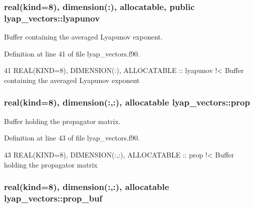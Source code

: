 \subsubsection[{\texorpdfstring{lyapunov}{lyapunov}}]{\setlength{\rightskip}{0pt plus 5cm}real(kind=8), dimension(\+:), allocatable, public lyap\+\_\+vectors\+::lyapunov}\hypertarget{namespacelyap__vectors_a9bf23b3cf7aebbfe17422bbd63e95bab}{}\label{namespacelyap__vectors_a9bf23b3cf7aebbfe17422bbd63e95bab}


Buffer containing the averaged Lyapunov exponent. 



Definition at line 41 of file lyap\+\_\+vectors.\+f90.


\begin{DoxyCode}
41   \textcolor{keywordtype}{REAL(KIND=8)}, \textcolor{keywordtype}{DIMENSION(:)}, \textcolor{keywordtype}{ALLOCATABLE} :: lyapunov\textcolor{comment}{   !< Buffer containing the averaged Lyapunov exponent}
\end{DoxyCode}
\subsubsection[{\texorpdfstring{prop}{prop}}]{\setlength{\rightskip}{0pt plus 5cm}real(kind=8), dimension(\+:,\+:), allocatable lyap\+\_\+vectors\+::prop\hspace{0.3cm}{\ttfamily [private]}}\hypertarget{namespacelyap__vectors_a64ed59283a3d1411d14735b924b5794b}{}\label{namespacelyap__vectors_a64ed59283a3d1411d14735b924b5794b}


Buffer holding the propagator matrix. 



Definition at line 43 of file lyap\+\_\+vectors.\+f90.


\begin{DoxyCode}
43   \textcolor{keywordtype}{REAL(KIND=8)}, \textcolor{keywordtype}{DIMENSION(:,:)}, \textcolor{keywordtype}{ALLOCATABLE} :: prop\textcolor{comment}{     !< Buffer holding the propagator matrix}
\end{DoxyCode}
\subsubsection[{\texorpdfstring{prop\+\_\+buf}{prop_buf}}]{\setlength{\rightskip}{0pt plus 5cm}real(kind=8), dimension(\+:,\+:), allocatable lyap\+\_\+vectors\+::prop\+\_\+buf\hspace{0.3cm}{\ttfamily [private]}}\hypertarget{namespacelyap__vectors_ac3665710ab2b402b9e952fa3311d2517}{}\label{namespacelyap__vectors_ac3665710ab2b402b9e952fa3311d2517}


